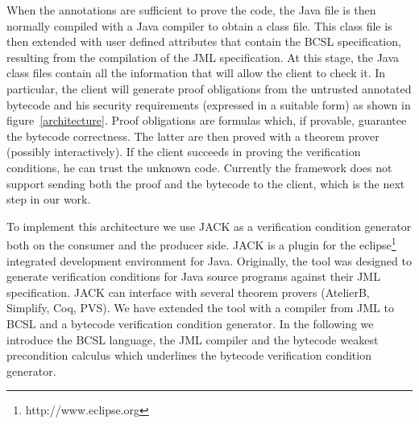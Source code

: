 When the annotations are sufficient to prove the code, 
the Java file is then normally compiled with a Java compiler to obtain a 
class file. This class file is then extended with user defined attributes that contain the BCSL specification, resulting from the compilation of the JML specification. 
At this stage, the Java class files contain all the information that will allow the client to check it. 
In particular, the client will generate proof obligations from the untrusted annotated bytecode and his security requirements 
(expressed in a suitable form) as shown in figure~\ref{architecture}. Proof obligations are formulas which, if provable, guarantee the bytecode correctness.
The latter are then proved with a theorem prover (possibly interactively). If the client succeeds in proving 
the verification conditions, he can trust the unknown code. Currently the framework does not support sending both the proof and the 
bytecode to the client, which is the next step in our work.


To implement this architecture we use JACK as a verification condition generator both on the consumer and the
producer side. JACK is a plugin for the eclipse\footnote{http://www.eclipse.org} integrated development environment for Java. Originally, the tool was designed to generate verification conditions for Java source programs against their JML specification. JACK can interface with several theorem provers (AtelierB, Simplify, Coq, PVS). We have extended the tool with a compiler from JML to BCSL and a bytecode verification condition generator. In the following we introduce the BCSL language, the JML compiler and the bytecode weakest precondition calculus which underlines the bytecode verification condition generator.
 
